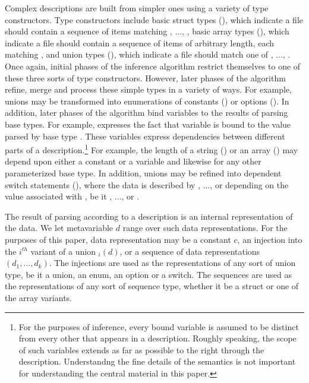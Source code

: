 Complex descriptions are built from simpler ones using a variety of
type constructors.  Type constructors include
basic struct types (), which indicate a file 
should contain a sequence of items matching , ..., ,
basic array types (), which indicate a file should contain
a sequence of items of arbitrary length, each matching ,
and union types (), which indicate a file
should match one of , ..., .  Once again, initial phases
of the inference algorithm restrict themselves to one of these three
sorts of type constructors.  However, later phases of the algorithm
refine, merge and process these simple types in a variety of ways.
For example, unions may be transformed into 
enumerations of constants
() or options ().  In
addition, later phases of the algorithm 
bind variables to the results of parsing 
base types.  For example,  expresses the fact that
variable  is bound to the value parsed by base type
.  These variables express dependencies between 
different parts
of a description.\footnote{For the purposes of inference, 
every bound variable is assumed to be distinct
from every other that appears in a description.  Roughly speaking,
the scope of such variables
extends as far as possible to the right through the description.
Understandng the fine details of the semantics is not important
for understanding the central material in this paper.}  
For example, the length of a string ()
or an array () may depend upon either a constant or
a variable and likewise for any other parameterized base type.  In
addition, unions may be refined into dependent switch statements
(), where the
data is described by , ..., or  depending on the value
associated with , be it , ..., or .

The result of parsing according to a description is an internal
representation of the data. We let metavariable $d$ range over such 
data representations.  For the purposes of this paper, data 
representation may be a constant $c$, an injection into the $i^{th}$
variant of a union $_i(d)$, or a sequence of data representations
$(d_1,\ldots,d_k)$.  The injections are used as the representations of
any sort of union type, be it a union, an enum, an option or a switch.
The sequences are used as the representations of any sort of sequence
type, whether it be a struct or one of the array variants.

